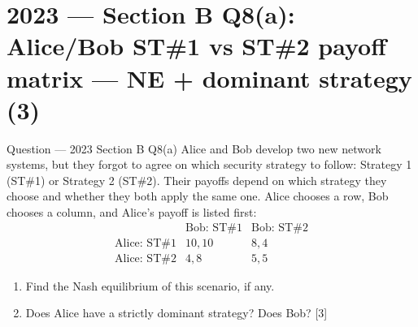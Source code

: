 \documentclass[12pt,a4paper]{article}
\begin{document}
\section{2023 --- Section B Q8(a): Alice/Bob ST\#1 vs ST\#2 payoff matrix --- NE + dominant strategy (3)}

\begin{qbox}{Question --- 2023 Section B Q8(a)}
Alice and Bob develop two new network systems, but they forgot to agree on which security strategy to follow: Strategy 1 (ST\#1) or Strategy 2 (ST\#2). Their payoffs depend on which strategy they choose and whether they both apply the same one. Alice chooses a row, Bob chooses a column, and Alice's payoff is listed first:
\[
\begin{array}{c|cc}
 & \text{Bob: ST\#1} & \text{Bob: ST\#2} \\\hline
\text{Alice: ST\#1} & 10,10 & 8,4 \\
\text{Alice: ST\#2} & 4,8 & 5,5
\end{array}
\]
\begin{enumerate}[label=(\roman*)]
  \item Find the Nash equilibrium of this scenario, if any.
  \item Does Alice have a strictly dominant strategy? Does Bob? \hfill [3]
\end{enumerate}
\end{qbox}
\end{document}
